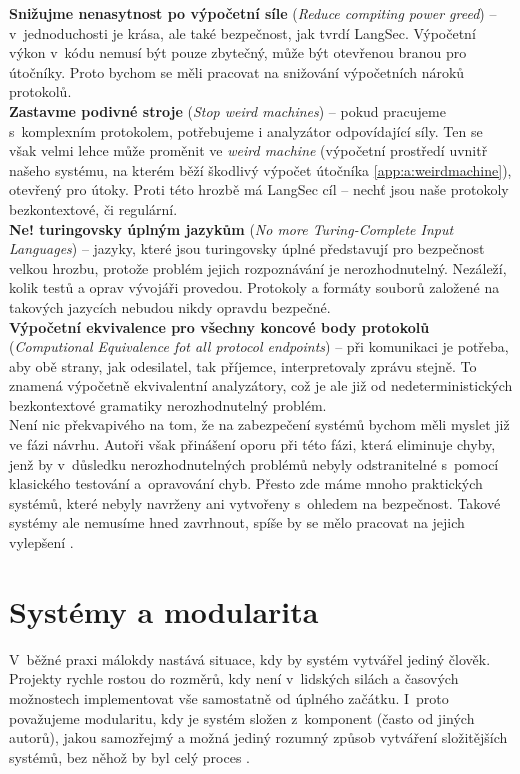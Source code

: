 \textbf{Snižujme nenasytnost po výpočetní síle} (\textit{Reduce compiting power greed}) -- v~jednoduchosti je krása, ale také bezpečnost, jak tvrdí 
LangSec. Výpočetní výkon v~kódu nemusí být pouze zbytečný, může být otevřenou branou pro útočníky. Proto bychom se měli pracovat na snižování 
výpočetních nároků protokolů. \\

\textbf{Zastavme podivné stroje} (\textit{Stop weird machines}) -- pokud pracujeme s~komplexním protokolem, potřebujeme i analyzátor odpovídající 
síly. Ten se však velmi lehce může proměnit ve \textit{weird machine} (výpočetní prostředí uvnitř našeho systému, na kterém běží škodlivý výpočet 
útočníka \ref{app:a:weirdmachine}), otevřený pro útoky. Proti této hrozbě má LangSec cíl -- nechť jsou naše protokoly bezkontextové, či regulární. \\

\textbf{Ne! turingovsky úplným jazykům} (\textit{No more Turing-Complete Input Languages})  -- jazyky, které jsou turingovsky úplné 
představují pro bezpečnost velkou hrozbu, protože problém jejich rozpoznávání je nerozhodnutelný. Nezáleží, kolik testů a oprav vývojáři provedou. 
Protokoly a formáty souborů založené na takových jazycích nebudou nikdy opravdu bezpečné. \\

\textbf{Výpočetní ekvivalence pro všechny koncové body protokolů} (\textit{Computional Equivalence fot all protocol endpoints}) -- při komunikaci 
je potřeba, aby obě strany, jak odesilatel, tak příjemce, interpretovaly zprávu stejně. To znamená výpočetně ekvivalentní analyzátory, což je ale 
již od nedeterministických bezkontextové gramatiky nerozhodnutelný problém. \\

Není nic překvapivého na tom, že na zabezpečení systémů bychom měli myslet již ve fázi návrhu. Autoři však přinášení oporu při této fázi, která 
eliminuje chyby, jenž by v~důsledku nerozhodnutelných problémů nebyly odstranitelné s~pomocí klasického testování a~opravování chyb. Přesto zde máme 
mnoho praktických systémů, které nebyly navrženy ani vytvořeny s~ohledem na bezpečnost. Takové systémy ale nemusíme hned zavrhnout, spíše by se mělo 
pracovat na jejich vylepšení \cite[str. 489]{Sass2013}.

\section{Systémy a modularita} \label{sec:4:systems}
V~běžné praxi málokdy nastává situace, kdy by systém vytvářel jediný člověk. Projekty rychle rostou do rozměrů, kdy není v~lidských silách a časových 
možnostech implementovat vše samostatně od úplného začátku. I~proto považujeme modularitu, kdy je systém složen z~komponent (často od jiných autorů), 
jakou samozřejmý a možná jediný rozumný způsob vytváření složitějších systémů, bez něhož by byl celý proces  \cite[str. 489]{Sass2013}. \\

